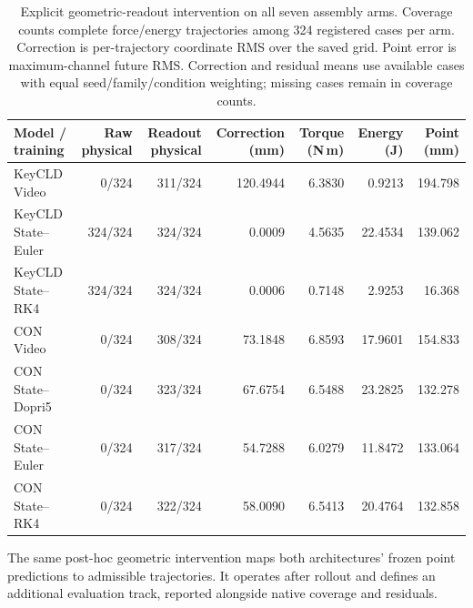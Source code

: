 \begin{table}[!t]
\caption{Explicit geometric-readout intervention on all seven assembly arms. Coverage counts complete force/energy trajectories among 324 registered cases per arm. Correction is per-trajectory coordinate RMS over the saved grid. Point error is maximum-channel future RMS. Correction and residual means use available cases with equal seed/family/condition weighting; missing cases remain in coverage counts.}
\label{app:geometry-readout-table}
\centering\small
\begin{tabular}{lrrrrrr}
\toprule
Model / training & Raw physical & Readout physical & Correction (mm) & Torque (N\,m) & Energy (J) & Point (mm)\\
\midrule
KeyCLD Video & 0/324 & 311/324 & 120.4944 & 6.3830 & 0.9213 & 194.798 \\
KeyCLD State--Euler & 324/324 & 324/324 & 0.0009 & 4.5635 & 22.4534 & 139.062 \\
KeyCLD State--RK4 & 324/324 & 324/324 & 0.0006 & 0.7148 & 2.9253 & 16.368 \\
CON Video & 0/324 & 308/324 & 73.1848 & 6.8593 & 17.9601 & 154.833 \\
CON State--Dopri5 & 0/324 & 323/324 & 67.6754 & 6.5488 & 23.2825 & 132.278 \\
CON State--Euler & 0/324 & 317/324 & 54.7288 & 6.0279 & 11.8472 & 133.064 \\
CON State--RK4 & 0/324 & 322/324 & 58.0090 & 6.5413 & 20.4764 & 132.858 \\
\bottomrule
\end{tabular}
\end{table}
The same post-hoc geometric intervention maps both architectures' frozen point predictions to admissible trajectories. It operates after rollout and defines an additional evaluation track, reported alongside native coverage and residuals.


